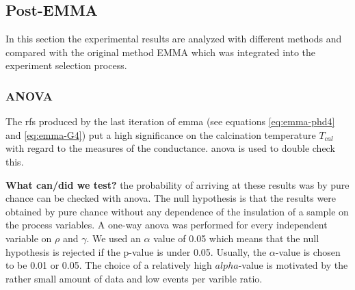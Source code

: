 \subsection{Post-EMMA}
\label{sec:res-post-emma}
In this section the experimental results are analyzed with different methods and compared with the original method EMMA which was integrated into the experiment selection process. 
\subsubsection{ANOVA}\label{sec:res-anova}
The \gls{rf}s produced by the last iteration of \gls{emma} (see equations \ref{eq:emma-phd4} and \ref{eq:emma-G4}) put a high significance
on the calcination temperature $T_{cal}$ with regard to the 
measures of the conductance. 
\Gls{anova} is used to double check this. 

\textbf{What can/did we test?}
the probability of arriving at these results was by pure chance can be checked with \gls{anova}. 
The null hypothesis is that the results were obtained by pure chance without any dependence of the insulation of a sample on the process variables.
A one-way \gls{anova} was performed for every independent variable on $\rho$ and $\gamma$. 
We used an $\alpha$ value of 0.05 which means that 
the null hypothesis is rejected if the p-value is under 0.05. 
Usually, the $\alpha$-value is chosen to be 0.01 or 0.05\cite{hoffman2020concept,sellke2001pvalues}.
The choice of a relatively high $alpha$-value is motivated by the rather small amount of data and low events per varible ratio.

